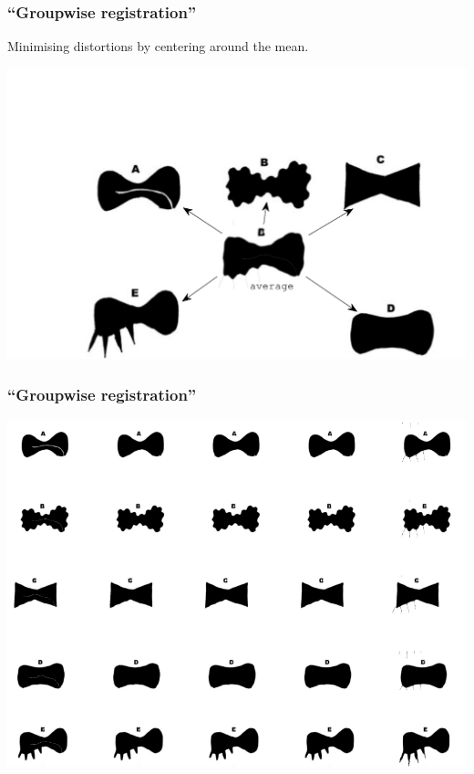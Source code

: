 
\begin{frame}
\frametitle{``Groupwise registration''}
Minimising distortions by centering around the mean.
\begin{center}
\includegraphics[width=.8\textwidth]{groupwise}
\end{center}
\end{frame}

\begin{frame}
\frametitle{``Groupwise registration''}
\begin{center}
\includegraphics[width=.7\textwidth]{aligned_ties}
\end{center}
\end{frame}

